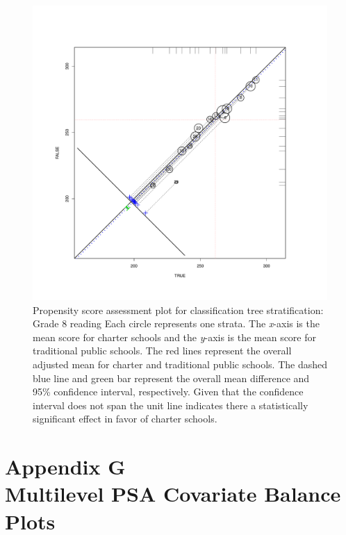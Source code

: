\begin{figure}
\begin{center}
\includegraphics[trim=0 .7in 0 .7in]{../Figures2009/g8read-circpsa-tree.pdf}
\caption[Propensity score assessment plot for classification tree stratification: Grade 8 reading]{Propensity score assessment plot for classification tree stratification: Grade 8 reading Each circle represents one strata. The \textit{x}-axis is the mean score for charter schools and the \textit{y}-axis is the mean score for traditional public schools. The red lines represent the overall adjusted mean for charter and traditional public schools. The dashed blue line and green bar represent the overall mean difference and 95\% confidence interval, respectively. Given that the confidence interval does not span the unit line indicates there a statistically significant effect in favor of charter schools.}
\end{center}
\end{figure}




\clearpage
{}
\section*{Appendix G\\Multilevel PSA Covariate Balance Plots}
\label{appendixG}

